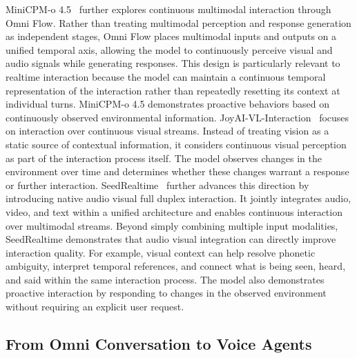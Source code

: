 MiniCPM-o 4.5~\cite{cui2026minicpm} further explores continuous multimodal interaction through Omni Flow. Rather than treating multimodal perception and response generation as independent stages, Omni Flow places multimodal inputs and outputs on a unified temporal axis, allowing the model to continuously perceive visual and audio signals while generating responses. This design is particularly relevant to realtime interaction because the model can maintain a continuous temporal representation of the interaction rather than repeatedly resetting its context at individual turns. MiniCPM-o 4.5 demonstrates proactive behaviors based on continuously observed environmental information. JoyAI-VL-Interaction~\cite{yao2026joyai} focuses on interaction over continuous visual streams. Instead of treating vision as a static source of contextual information, it considers continuous visual perception as part of the interaction process itself. The model observes changes in the environment over time and determines whether these changes warrant a response or further interaction. SeedRealtime~\cite{seedrealtime2026} further advances this direction by introducing native audio visual full duplex interaction. It jointly integrates audio, video, and text within a unified architecture and enables continuous interaction over multimodal streams. Beyond simply combining multiple input modalities, SeedRealtime demonstrates that audio visual integration can directly improve interaction quality. For example, visual context can help resolve phonetic ambiguity, interpret temporal references, and connect what is being seen, heard, and said within the same interaction process. The model also demonstrates proactive interaction by responding to changes in the observed environment without requiring an explicit user request.



\subsection{From Omni Conversation to Voice Agents}

